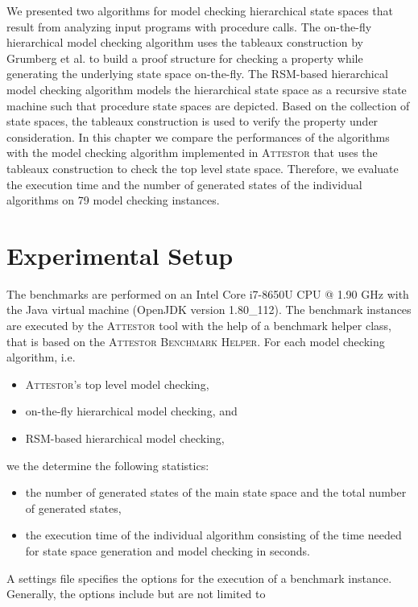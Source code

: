 \documentclass[a4paper, 12pt, twoside]{report}
\begin{document}
	We presented two algorithms for model checking hierarchical state spaces that result from analyzing input programs with procedure calls. The on-the-fly hierarchical model checking algorithm uses the tableaux construction by Grumberg et al. \cite{bhat1995efficient} to build a proof structure for checking a property while generating the underlying state space on-the-fly. The RSM-based hierarchical model checking algorithm models the hierarchical state space as a recursive state machine such that procedure state spaces are depicted. Based on the collection of state spaces, the tableaux construction is used to verify the property under consideration. In this chapter we compare the performances of the algorithms with the model checking algorithm implemented in \textsc{Attestor} that uses the tableaux construction to check the top level state space. Therefore, we evaluate the execution time and the number of generated states of the individual algorithms on 79 model checking instances. 
	
	\section{Experimental Setup}
	
	The benchmarks are performed on an Intel Core i7-8650U CPU @ 1.90 GHz with the Java virtual machine (OpenJDK version 1.80\_112). The benchmark instances are executed by the \textsc{Attestor} tool with the help of a benchmark helper class, that is based on the \textsc{Attestor Benchmark Helper}. For each model checking algorithm, i.e.
	\begin{itemize}
		\item \textsc{Attestor}'s top level model checking,
		\item on-the-fly hierarchical model checking, and
		\item RSM-based hierarchical model checking,
	\end{itemize}
	we the determine the following statistics:
	\begin{itemize}
		\item the number of generated states of the main state space and the total number of generated states,
		\item the execution time of the individual algorithm consisting of the time needed for state space generation and model checking in seconds. 
	\end{itemize}  

	A settings file specifies the options for the execution of a benchmark instance. Generally, the options include but are not limited to
	
\end{document}
